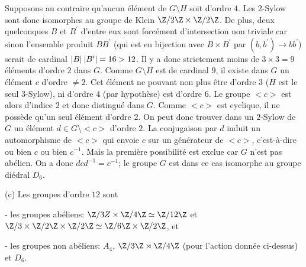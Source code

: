 {{\hskip 5mm Supposons au contraire qu'aucun \'el\'ement de $G\setminus H$ soit
d'ordre $4$. Les $2$-Sylow sont donc isomorphes au groupe de Klein $\Z/2\Z
\times \Z/2\Z$. De plus, deux quelconques $B$ et $B^\prime$ d'entre eux sont
forc\'ement d'intersection non triviale car sinon l'ensemble produit $B B^\prime$
(qui est en bijection avec $B\times B^\prime$ par $(b,b^\prime)\rightarrow
bb^\prime$) serait de cardinal $|B|\hskip 2pt |B^\prime| = 16>12$. Il y a donc
strictement moins de $3\times 3 =9$ \'el\'ements d'ordre $2$ dans $G$. Comme
$G\setminus H$ est de cardinal $9$, il existe dans $G$ un \'el\'ement $c$ 
d'ordre $\not=2$. Cet \'el\'ement ne pouvant non plus \^etre  
d'ordre $3$ ($H$ est le seul $3$-Sylow), ni d'ordre $4$ (par hypoth\`ese) est
d'ordre $6$. Le groupe $<c>$ est alors d'indice $2$ et donc distingu\'e dans $G$.
Comme $<c>$ est cyclique, il ne poss\`ede qu'un seul \'el\'ement d'ordre $2$. On
peut donc trouver dans un $2$-Sylow de $G$ un \'el\'ement $d\in G\setminus <c>$
d'ordre $2$. La conjugaison par $d$ induit un automorphisme de $<c>$ qui envoie $c$
sur un g\'en\'erateur de $<c>$, c'est-\`a-dire ou bien $c$ ou bien $c^{-1}$. Mais la
premi\`ere possibilit\'e est exclue car $G$ n'est pas ab\'elien. On a donc
$dcd^{-1}=c^{-1}$; le groupe $G$ est dans ce cas isomorphe au groupe di\'edral
$D_6$.
\smallskip

(c) Les groupes d'ordre $12$ sont 

- les groupes ab\'eliens: $\Z/3Z \times \Z/4\Z \simeq \Z/12\Z$ et $\Z/3 \times
\Z/2\Z \times \Z/2\Z \simeq \Z/6\Z \times \Z/2\Z$, et

- les groupes non ab\'eliens: $A_4$, $\Z/3\Z \rtimes
\Z/4\Z$ (pour l'action donn\'ee ci-dessus)
et $D_6$.
}
}

